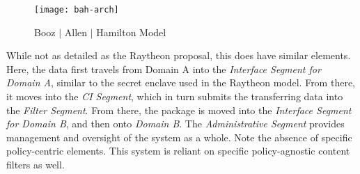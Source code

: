 \begin{figure}[!t]
\centering
\texttt{[image: bah-arch]}
\caption{Booz $\mid$ Allen $\mid$ Hamilton Model}
\label{fig:model:conceptual-model-bah}
\end{figure}

While not as detailed as the Raytheon proposal, this does have similar elements.  Here, the data first travels from Domain A into the \textit{Interface Segment for Domain A}, similar to the secret enclave used in the Raytheon model.  From there, it moves into the \textit{CI Segment}, which in turn submits the transferring data into the \textit{Filter Segment}.  From there, the package is moved into the \textit{Interface Segment for Domain B}, and then onto \textit{Domain B}.  The \textit{Administrative Segment} provides management and oversight of the system as a whole.  Note the absence of specific policy-centric elements.  This system is reliant on specific policy-agnostic content filters as well.